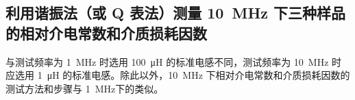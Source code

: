 \documentclass[a4paper,utf8]{article}
\begin{document}
    \subsection{利用谐振法（或 Q 表法）测量 \SI{10}{\mega\hertz} 下三种样品的相对介电常数和介质损耗因数}
        与测试频率为 \SI{1}{\mega\hertz} 时选用 \SI{100}{\micro\henry} 的标准电感不同，测试频率为 \SI{10}{\mega\hertz} 时应选用 \SI{1}{\micro\henry} 的标准电感。除此以外，\SI{10}{\mega\hertz} 下相对介电常数和介质损耗因数的测试方法和步骤与 \SI{1}{\mega\hertz}下的类似。
\end{document}
